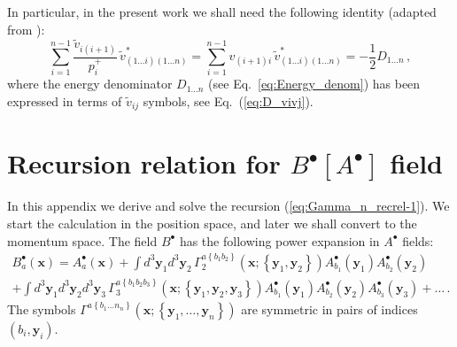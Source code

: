 \documentclass[english,american]{article}
\begin{document}
In particular, in the present work we shall need the following identity
(adapted from \citep{Motyka2009}):
\begin{equation}
\sum_{i=1}^{n-1}\frac{\tilde{v}_{i\left(i+1\right)}}{p_{i}^{+}}\,\tilde{v}_{\left(1\dots i\right)\left(1\dots n\right)}^{*}=\sum_{i=1}^{n-1}v_{\left(i+1\right)i}\,\tilde{v}_{\left(1\dots i\right)\left(1\dots n\right)}^{*}=-\frac{1}{2}D_{1\dots n}\,,\label{eq:MotykaStasto_rel1}
\end{equation}
where the energy denominator $D_{1\dots n}$ (see Eq.~\eqref{eq:Energy_denom}) has been expressed
in terms of $\tilde{v}_{ij}$ symbols, see Eq.~(\ref{eq:D_vivj}).


\section{Recursion relation for $B^{\bullet}\left[A^{\bullet}\right]$ field}

\label{sec:App_B[A]}

In this appendix we derive and solve the recursion (\ref{eq:Gamma_n_recrel-1}).
We start the calculation in the position space, and later we shall convert to the momentum
space. The field $B^{\bullet}$ has the following power expansion in $A^{\bullet}$
fields:
\begin{multline}
B_{a}^{\bullet}\left(\mathbf{x}\right)=A_{a}^{\bullet}\left(\mathbf{x}\right)+\int d^{3}\mathbf{y}_{1}d^{3}\mathbf{y}_{2}\,\Gamma_{2}^{a\left\{ b_{1}b_{2}\right\} }\left(\mathbf{x};\left\{ \mathbf{y}_{1},\mathbf{y}_{2}\right\} \right)A_{b_{1}}^{\bullet}\left(\mathbf{y}_{1}\right)A_{b_{2}}^{\bullet}\left(\mathbf{y}_{2}\right)\\
+\int d^{3}\mathbf{y}_{1}d^{3}\mathbf{y}_{2}d^{3}\mathbf{y}_{3}\,\Gamma_{3}^{a\left\{ b_{1}b_{2}b_{3}\right\} }\left(\mathbf{x};\left\{ \mathbf{y}_{1},\mathbf{y}_{2},\mathbf{y}_{3}\right\} \right)A_{b_{1}}^{\bullet}\left(\mathbf{y}_{1}\right)A_{b_{2}}^{\bullet}\left(\mathbf{y}_{2}\right)A_{b_{3}}^{\bullet}\left(\mathbf{y}_{3}\right)+\dots\,.\label{eq:Bplus_expansion}
\end{multline}
The symbols $\Gamma^{a\left\{ b_{1}\dots n_{n}\right\} }\left(\mathbf{x};\left\{ \mathbf{y}_{1},\dots,\mathbf{y}_{n}\right\} \right)$
are symmetric in pairs of indices $\left(b_{i},\mathbf{y}_{i}\right)$. 
\end{document}
